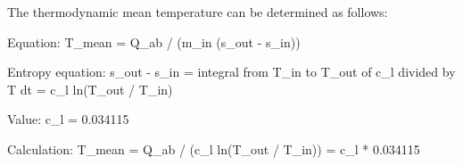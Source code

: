 The thermodynamic mean temperature can be determined as follows:  

Equation:  
T_mean = Q_ab / (m_in (s_out - s_in))  

Entropy equation:  
s_out - s_in = integral from T_in to T_out of c_l divided by T dt = c_l ln(T_out / T_in)  

Value:  
c_l = 0.034115  

Calculation:  
T_mean = Q_ab / (c_l ln(T_out / T_in)) = c_l * 0.034115